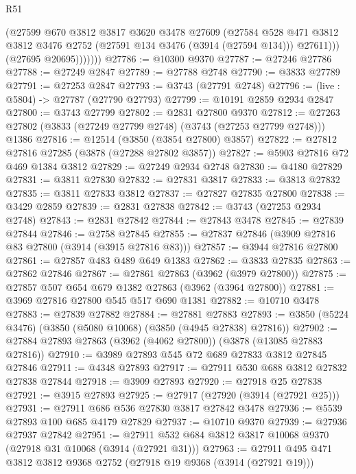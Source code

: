 \begin{lexlean}{R51}
\begin{coremodule}
                  (@27599
                    @670
                    @3812
                    @3817
                    @3620
                    @3478
                    @27609
                    (@27584
                      @528
                      @471
                      @3812
                      @3812
                      @3476
                      @2752
                      (@27591 @134 @3476 (@3914 (@27594 @134)))
                      @27611)))
                (@27695 @20695)))))))
@27786 := @10300 @9370
@27787 := @27246 @27786
@27788 := @27249 @2847
@27789 := @27788 @2748
@27790 := @3833 @27789
@27791 := @27253 @2847
@27793 := @3743 (@27791 @2748)
@27796 := (live : @5804) -> @27787 (@27790 @27793)
@27799 := @10191 @2859 @2934 @2847
@27800 := @3743 @27799
@27802 := @2831 @27800 @9370
@27812 := @27263 @27802 (@3833 (@27249 @27799 @2748) (@3743 (@27253 @27799 @2748))) @1386
@27816 := @12514 (@3850 (@3854 @27800) @3857)
@27822 := @27812 @27816 @27285 (@3878 (@27288 @27802 @3857))
@27827 := @5903 @27816 @72 @469 @1384 @3812
@27829 := @27249 @2934 @2748
@27830 := @4180 @27829
@27831 := @3811 @27830
@27832 := @27831 @3817
@27833 := @3813 @27832
@27835 := @3811 @27833 @3812
@27837 := @27827 @27835 @27800
@27838 := @3429 @2859
@27839 := @2831 @27838
@27842 := @3743 (@27253 @2934 @2748)
@27843 := @2831 @27842
@27844 := @27843 @3478
@27845 := @27839 @27844
@27846 := @2758 @27845
@27855 := @27837 @27846 (@3909 @27816 @83 @27800 (@3914 (@3915 @27816 @83)))
@27857 := @3944 @27816 @27800
@27861 := @27857 @483 @489 @649 @1383
@27862 := @3833 @27835
@27863 := @27862 @27846
@27867 := @27861 @27863 (@3962 (@3979 @27800))
@27875 := @27857 @507 @654 @679 @1382 @27863 (@3962 (@3964 @27800))
@27881 := @3969 @27816 @27800 @545 @517 @690 @1381
@27882 := @10710 @3478
@27883 := @27839 @27882
@27884 := @27881 @27883
@27893 := @3850 (@5224 @3476) (@3850 (@5080 @10068) (@3850 (@4945 @27838) @27816))
@27902 := @27884 @27893 @27863 (@3962 (@4062 @27800)) (@3878 (@13085 @27883 @27816))
@27910 := @3989 @27893 @545 @72 @689 @27833 @3812 @27845 @27846
@27911 := @4348 @27893
@27917 := @27911 @530 @688 @3812 @27832 @27838 @27844
@27918 := @3909 @27893
@27920 := @27918 @25 @27838
@27921 := @3915 @27893
@27925 := @27917 (@27920 (@3914 (@27921 @25)))
@27931 := @27911 @686 @536 @27830 @3817 @27842 @3478
@27936 := @5539 @27893 @100 @685 @4179 @27829
@27937 := @10710 @9370
@27939 := @27936 @27937 @27842
@27951 := @27911 @532 @684 @3812 @3817 @10068 @9370 (@27918 @31 @10068 (@3914 (@27921 @31)))
@27963 := @27911 @495 @471 @3812 @3812 @9368 @2752 (@27918 @19 @9368 (@3914 (@27921 @19)))

\end{coremodule}
\end{lexlean}
